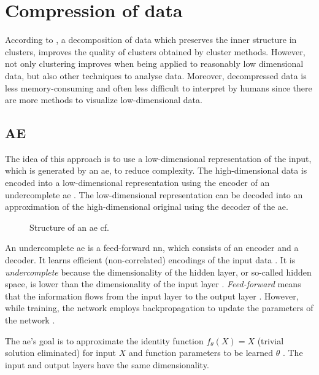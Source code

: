 \section{Compression of data}\label{subsec:compression}

According to \citeauthor{clusteringDocs2020}, a decomposition of data which preserves the inner structure in clusters, 
improves the quality of clusters obtained by cluster methods.
However, not only clustering improves when being applied to reasonably low dimensional data, but also other techniques to analyse data.
Moreover, decompressed data is less memory-consuming and often less difficult to interpret by humans 
since there are more methods to visualize low-dimensional data.

\subsection{AE}\label{subsec:autoencoder}

The idea of this approach is to use a low-dimensional representation of the input, which is generated by an \ac{ae}, to reduce complexity.
The high-dimensional data is encoded into a low-dimensional representation using the encoder of an undercomplete \ac{ae} \cite{autoencoder2020}.
The low-dimensional representation can be decoded into an approximation of the high-dimensional original using the decoder of the \ac{ae}.

\begin{figure}[h] %
    \centering
    
    \caption{Structure of an \ac{ae} cf. \cite{autoencoder2020}}
    \label{fig:ae}
\end{figure}

An undercomplete \ac{ae} is a feed-forward \ac{nn}, which consists of an encoder and a decoder.
It learns efficient (non-correlated) encodings of the input data \cite{autoencoder2020}.
It is \textit{undercomplete} because the dimensionality of the hidden layer, or so-called hidden space, 
is lower than the dimensionality of the input layer \cite{seminar_ies}.
\textit{Feed-forward} means that the information flows from the input layer to the output layer \cite{seminar_ies}.
However, while training, the network employs backpropagation to update the parameters of the network \cite{seminar_ies}.

The \ac{ae}'s goal is to approximate the identity function $f_\theta(X) = X$ (trivial solution eliminated) for input $X$ and 
function parameters to be learned $\theta$ \cite{seminar_ies}.
The input and output layers have the same dimensionality.

